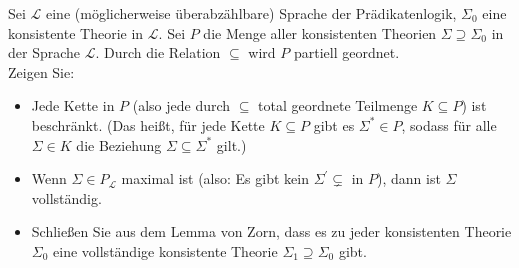 
\begin{exercise}[117]

Sei $\mathscr{L}$ eine (möglicherweise überabzählbare) Sprache der Prädikatenlogik,
$\Sigma_0$ eine konsistente Theorie in $\mathscr{L}$. Sei $P$ die Menge aller konsistenten
Theorien $\Sigma \supseteq \Sigma_0$ in der Sprache $\mathscr{L}$. Durch die
Relation $\subseteq$ wird $P$ partiell geordnet. \\
Zeigen Sie:
\begin{itemize}
  \item Jede Kette in $P$ (also jede durch $\subseteq$ total geordnete Teilmenge $K \subseteq P$)
  ist beschränkt. (Das heißt, für jede Kette $K \subseteq P$ gibt es $\Sigma^* \in P$,
  sodass für alle $\Sigma \in K$ die Beziehung $\Sigma \subseteq \Sigma^*$ gilt.)
  \item Wenn $\Sigma \in P_{\mathscr{L}}$ maximal ist (also: Es gibt kein
  $\Sigma^{\prime} \subsetneq$ in $P$), dann ist $\Sigma$ vollständig.
  \item Schließen Sie aus dem Lemma von Zorn, dass es zu jeder konsistenten Theorie
  $\Sigma_0$ eine vollständige konsistente Theorie $\Sigma_1 \supseteq \Sigma_0$ gibt.
\end{itemize}
\end{exercise}


